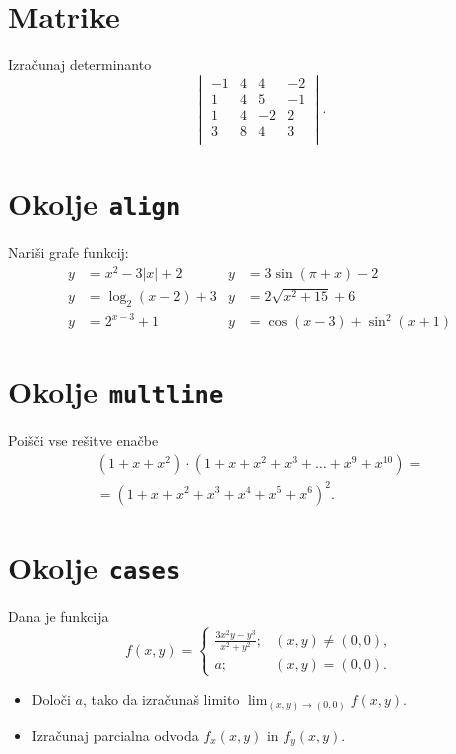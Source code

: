 \documentclass[a4paper,12pt]{article}
\begin{document}
\section*{Matrike}
Izračunaj determinanto
\[\begin{vmatrix}
    -1 & 4 & 4 & -2 \\
    1 & 4 & 5 & -1 \\
    1 & 4 & -2 & 2 \\
    3 & 8 & 4 & 3 \\
\end{vmatrix}.\]

\section*{Okolje \texttt{align}}
Nariši grafe funkcij:
\begin{align*}
   y &= x^2 - 3|x| + 2    &y &= 3 \sin(\pi+x) - 2\\
   y &= \log_2(x-2) + 3   &y &= 2 \sqrt{x^2+15} + 6\\
   y &= 2^{x-3} + 1       &y &= \cos(x-3) + \sin^2(x+1)
\end{align*}

\section*{Okolje \texttt{multline}}
Poišči vse rešitve enačbe
\begin{multline*}
   (1+x+x^2) \cdot (1+x+x^2+x^3+\ldots+x^9+x^{10}) =\\
   =(1+x+x^2+x^3+x^4+x^5+x^6)^2.
\end{multline*}

\section*{Okolje \texttt{cases}}
Dana je funkcija
\[
f(x,y)=
\begin{cases}
   \frac{3x^2y-y^3}{x^2+y^2}; & (x,y)\ne(0,0),\\
   a; & (x,y)=(0,0).
\end{cases}
\]
\begin{itemize}
\item Določi \(a\), tako da izračunaš limito \( \lim_{(x,y)\to(0,0)} f(x,y) \).
\item Izračunaj parcialna odvoda \(f_x(x,y)\) in \(f_y(x,y)\).
\end{itemize}
\end{document}

